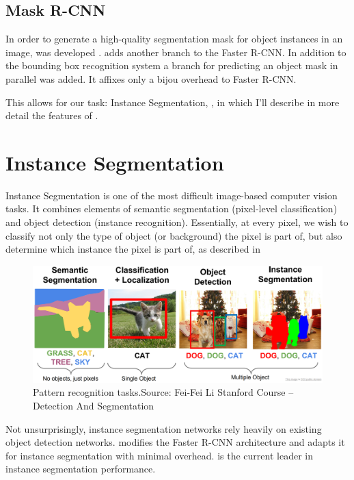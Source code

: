 \subsection{Mask R-CNN}\label{s:nnevo-maskrcnn}

In order to generate a high-quality segmentation mask for object instances in an image, \maskrcnn was developed \cite{He_2017}. \maskrcnn adds another branch to the Faster R-CNN. In addition to the bounding box recognition system a branch for predicting an object mask in parallel was added. It affixes only a bijou overhead to Faster R-CNN. 

This allows for our task: Instance Segmentation, , in which I'll describe in more detail the features of \maskrcnn.


\section{Instance Segmentation}\label{s:maskrcnn}

Instance Segmentation is one of the most difficult image-based computer vision tasks. It combines elements of semantic segmentation (pixel-level classification) and object detection (instance recognition). Essentially, at every pixel, we wish to classify not only the type of object (or background) the pixel is part of, but also determine which instance the pixel is part of, as described in 

\begin{figure}[H]
	\centering
	\includegraphics[scale=0.3]{images/tasks.PNG}
	\caption{Pattern recognition tasks.\newline Source: Fei-Fei Li Stanford Course -- Detection And Segmentation}
	\label{f:tasks}
\end{figure}

Not unsurprisingly, instance segmentation networks rely heavily on existing object detection networks. \maskrcnn modifies the Faster R-CNN architecture and adapts it for instance segmentation with minimal overhead. \maskrcnn is the current leader in instance segmentation performance.


